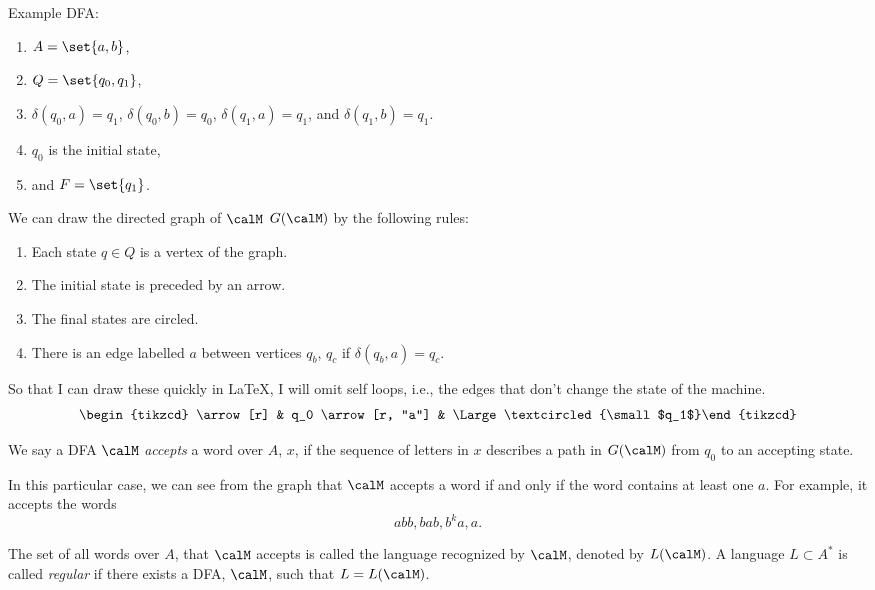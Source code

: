\documentclass{article}
\theoremstyle{remark}
\begin{document}
\begin{example}

    Example DFA:
    \begin{enumerate}
        \item $A=\set{a,b}$, 
        \item $Q=\set{q_0,q_1}$,
        \item $\delta(q_0,a) = q_1$, $\delta(q_0,b) = q_0$,
            $\delta(q_1,a) = q_1$, and $\delta(q_1,b) = q_1$.
        \item $q_0$ is the initial state,
        \item and $F=\set{q_1}$.
    \end{enumerate}

    We can draw the directed graph of $\calM$ $G(\calM)$ by the
    following rules:
    \begin{enumerate}
        \item Each state $q\in Q$ is a vertex of the graph.
        \item The initial state is preceded by an arrow.
        \item The final states are circled.
        \item There is an edge labelled $a$ between vertices
            $q_b$, $q_c$ if $\delta(q_b,a)=q_c$.
    \end{enumerate}

    So that I can draw these quickly in LaTeX, I will omit 
    self loops, i.e., the edges that don't change the state
    of the machine.
    \[
    \begin{tikzcd}
    \arrow[r] & q_0 \arrow[r, "a"] & \Large\textcircled{\small$q_1$}%
    \end{tikzcd}
    \]

    \begin{definition}[Informal]
        We say a DFA $\calM$ \emph{accepts} a word over $A$, $x$,
        if the sequence 
        of letters in $x$ describes a path in $G(\calM)$ from $q_0$
        to an accepting state.
    \end{definition}

    In this particular case, we can see from the graph that
    $\calM$ accepts a word if and only if the word contains
    at least one $a$. For example, it accepts the words
    \[ abb, bab, b^ka, a.\]

    \begin{definition}[Informal]
        The set of all words over $A$, that $\calM$ accepts is 
        called the language recognized by $\calM$, denoted
        by $L(\calM)$. A language $L\subset A^*$ is called
        \emph{regular} if there exists a DFA, $\calM$, such that
        $L=L(\calM)$.
    \end{definition}


\end{example}
\end{document}
